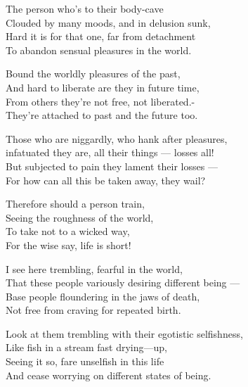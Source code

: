 \begin{MyDescription}{}
The person who's to their body-cave\\
Clouded by many moods, and in delusion sunk,\\
Hard it is for that one, far from detachment\\
To abandon sensual pleasures in the world.
\end{MyDescription}

\begin{MyDescription}{}
Bound the worldly pleasures of the past,\\
And hard to liberate are they in future time,\\
From others they're not free, not liberated.-\\
They're attached to past and the future too.
\end{MyDescription}

\begin{MyDescription}{}
Those who are niggardly, who hank after pleasures,\\
infatuated they are, all their things — losses all!\\
But subjected to pain they lament their losses —\\
For how can all this be taken away, they wail?
\end{MyDescription}

\begin{MyDescription}{}
Therefore should a person train,\\
Seeing the roughness of the world,\\
To take not to a wicked way,\\
For the wise say, life is short!
\end{MyDescription}

\begin{MyDescription}{}
I see here trembling, fearful in the world,\\
That these people variously desiring different being —\\
Base people floundering in the jaws of death,\\
Not free from craving for repeated birth.
\end{MyDescription}

\begin{MyDescription}{}
Look at them trembling with their egotistic selfishness,\\
Like fish in a stream fast drying—up,\\
Seeing it so, fare unselfish in this life\\
And cease worrying on different states of being.
\end{MyDescription}

